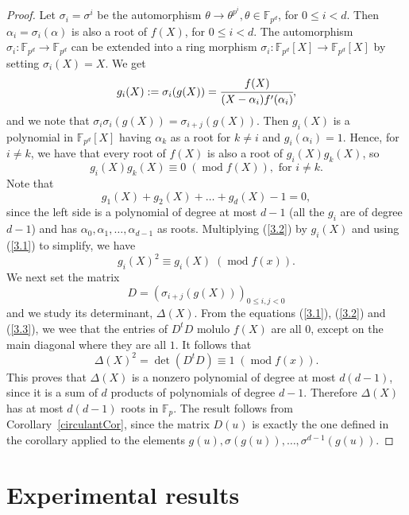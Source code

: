 \documentclass[a4paper,11pt]{article}
\theoremstyle{break}
\theoremstyle{sc}
\theoremstyle{definition}
\theoremstyle{remark}
\DeclareMathOperator{\Mod}{mod}
\begin{document}
\begin{proof}
  Let $\sigma_i=\sigma^i$ be the automorphism
  $\theta\to\theta^{p^i},\theta\in\mathbb{F}_{p^d}$, for $0\leq i <d$. Then
  $\alpha_i=\sigma_i(\alpha)$ is also a root of $f(X)$, for $0\leq i <d$. The
  automorphism $\sigma_i:\mathbb{F}_{p^d}\to\mathbb{F}_{p^d}$ can be extended
  into a ring morphism
  $\sigma_i:\mathbb{F}_{p^d}[X]\to\mathbb{F}_{p^d}[X]$ by setting
  $\sigma_i(X)=X$. We get
  \[
    g_i(X):=\sigma_i(g(X)) = \cfrac{f(X)}{(X-\alpha_i)f'(\alpha_i)},
  \]
  and we note that $\sigma_i\sigma_i(g(X)) = \sigma_{i+j}(g(X))$. Then
  $g_i(X)$ is a polynomial in $\mathbb{F}_{p^d}[X]$ having $\alpha_k$ as a root
  for $k\neq i$ and $g_i(\alpha_i)=1$. Hence, for $i\neq k$, we have that every
  root of $f(X)$ is also a root of $g_i(X)g_k(X)$, so
  \begin{equation}
    g_i(X)g_k(X) \equiv 0 \;(\Mod f(X)), \textrm{ for }i\neq k.
    \label{3.1}
  \end{equation}
  Note that 
  \begin{equation}
    g_1(X)+g_2(X)+\dots+g_d(X)-1=0,
    \label{3.2}
  \end{equation}
  since the left side is a polynomial of degree at most $d-1$ (all the
  $g_i$
  are of degree $d-1$) and has $\alpha_0,
  \alpha_1, \dots, \alpha_{d-1}$ as roots. Multiplying (\ref{3.2}) by $g_i(X)$
  and using (\ref{3.1}) to simplify, we have
  \begin{equation}
    g_i(X)^2 \equiv g_i(X)\;(\Mod f(x)).
    \label{3.3}
  \end{equation}
  We next set the matrix
  \[
    D=(\sigma_{i+j}(g(X)))_{0\leq i,j <0}
  \]
  and we study its determinant, $\Delta(X)$. From the equations
  (\ref{3.1}), (\ref{3.2}) and (\ref{3.3}), we wee that the entries of $D^tD$
  molulo $f(X)$ are all $0$, except on the main diagonal where they are all
  $1$. It follows that
  \[
    \Delta(X)^2 = \det(D^tD) \equiv 1\;(\Mod f(x)).
  \]
  This proves that $\Delta(X)$ is a nonzero polynomial of degree at most
  $d(d-1)$, since it is a sum of $d$ products of polynomials of degree
  $d-1$. Therefore $\Delta(X)$ has at most $d(d-1)$ roots in
  $\mathbb{F}_p$. The result follows from Corollary~\ref{circulantCor}, since the matrix
  $D(u)$ is exactly the one defined in the corollary applied to the elements
  $g(u), \sigma(g(u)),\dots,\sigma^{d-1}(g(u))$.
\end{proof}

\section{Experimental results}

\clearpage


\end{document}
